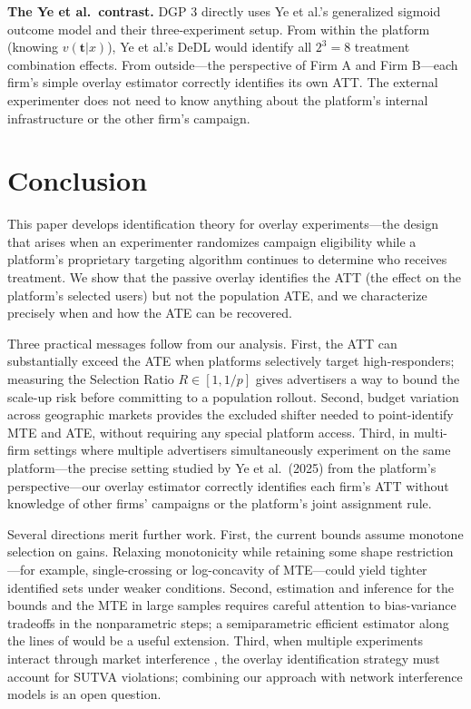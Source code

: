 \documentclass[12pt]{article}
\begin{document}
\textbf{The Ye et al.\ contrast.} DGP 3 directly uses Ye et al.'s generalized
sigmoid outcome model and their three-experiment setup. From within the
platform (knowing $v(\mathbf{t}|x)$), Ye et al.'s DeDL would identify all
$2^3 = 8$ treatment combination effects. From outside---the perspective of
Firm A and Firm B---each firm's simple overlay estimator correctly identifies
its own ATT. The external experimenter does not need to know anything about
the platform's internal infrastructure or the other firm's campaign.

\section{Conclusion}
\label{sec:conclusion}

This paper develops identification theory for overlay experiments---the
design that arises when an experimenter randomizes campaign eligibility
while a platform's proprietary targeting algorithm continues to determine
who receives treatment. We show that the passive overlay identifies the
ATT (the effect on the platform's selected users) but not the population
ATE, and we characterize precisely when and how the ATE can be recovered.

Three practical messages follow from our analysis. First, the ATT can
substantially exceed the ATE when platforms selectively target
high-responders; measuring the Selection Ratio $R \in [1, 1/p]$ gives
advertisers a way to bound the scale-up risk before committing to a
population rollout. Second, budget variation across geographic markets
provides the excluded shifter needed to point-identify MTE and ATE,
without requiring any special platform access. Third, in multi-firm
settings where multiple advertisers simultaneously experiment on the same
platform---the precise setting studied by Ye et al.\ (2025) from the
platform's perspective---our overlay estimator correctly identifies each
firm's ATT without knowledge of other firms' campaigns or the platform's
joint assignment rule.

Several directions merit further work. First, the current bounds assume
monotone selection on gains. Relaxing monotonicity while retaining some
shape restriction---for example, single-crossing or log-concavity of
MTE---could yield tighter identified sets under weaker conditions. Second,
estimation and inference for the bounds and the MTE in large samples
requires careful attention to bias-variance tradeoffs in the nonparametric
steps; a semiparametric efficient estimator along the lines of
\citet{chernozhukov2018double} would be a useful extension. Third, when
multiple experiments interact through market interference
\citep{johari2022experimental}, the overlay identification strategy must
account for SUTVA violations; combining our approach with network
interference models is an open question.
\end{document}
